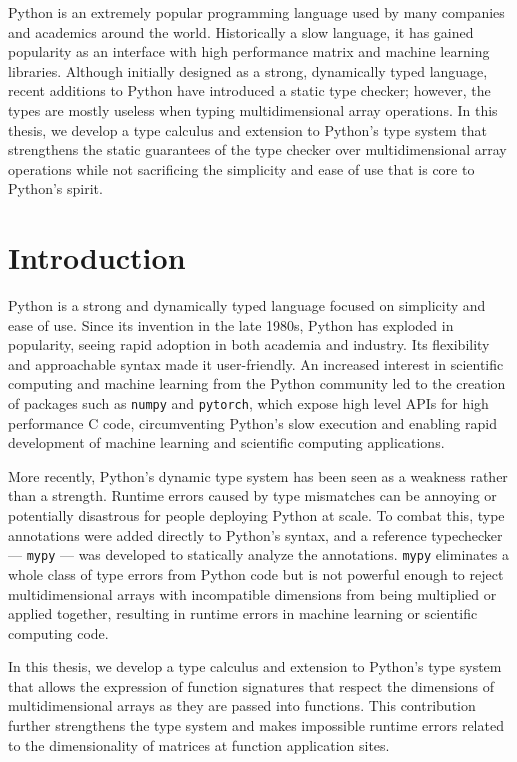 \documentclass{report}
\begin{document}
Python is an extremely popular programming language used by many companies and academics around the world. Historically a slow language, it has gained popularity as an interface with high performance matrix and machine learning libraries. Although initially designed as a strong, dynamically typed language, recent additions to Python have introduced a static type checker; however, the types are mostly useless when typing multidimensional array operations. In this thesis, we develop a type calculus and extension to Python's type system that strengthens the static guarantees of the type checker over multidimensional array operations while not sacrificing the simplicity and ease of use that is core to Python's spirit.

\tableofcontents

\chapter{Introduction}

Python is a strong and dynamically typed language focused on simplicity and ease of use. Since its invention in the late 1980s, Python has exploded in popularity, seeing rapid adoption in both academia and industry. Its flexibility and approachable syntax made it user-friendly. An increased interest in scientific computing and machine learning from the Python community led to the creation of packages such as \texttt{numpy} and \texttt{pytorch}, which expose high level APIs for high performance C code, circumventing Python's slow execution and enabling rapid development of machine learning and scientific computing applications.

More recently, Python's dynamic type system has been seen as a weakness rather than a strength. Runtime errors caused by type mismatches can be annoying or potentially disastrous for people deploying Python at scale. To combat this, type annotations were added directly to Python's syntax, and a reference typechecker --- \texttt{mypy} --- was developed to statically analyze the annotations. \texttt{mypy} eliminates a whole class of type errors from Python code but is not powerful enough to reject multidimensional arrays with incompatible dimensions from being multiplied or applied together, resulting in runtime errors in machine learning or scientific computing code.

In this thesis, we develop a type calculus and extension to Python's type system that allows the expression of function signatures that respect the dimensions of multidimensional arrays as they are passed into functions. This contribution further strengthens the type system and makes impossible runtime errors related to the dimensionality of matrices at function application sites.
\end{document}
